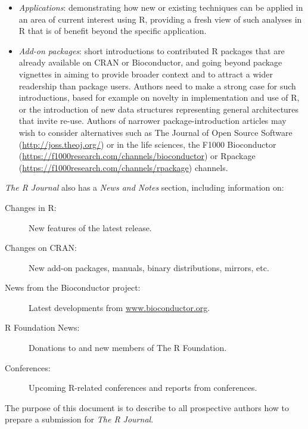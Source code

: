 \documentclass[a4paper]{report}
\begin{document}
\begin{article}
\begin{itemize}
\item \emph{Applications}: demonstrating how new or existing techniques can be applied in an area of current interest using R, providing a fresh view of such analyses in R that is of benefit beyond the specific application.

\item \emph{Add-on packages}: short introductions to contributed R packages that are already available on CRAN or Bioconductor, and going beyond package vignettes in aiming to provide broader context and to attract a wider readership than package users. Authors need to make a strong case for such introductions, based for example on novelty in implementation and use of R, or the introduction of new data structures representing general architectures that invite re-use. Authors of narrower package-introduction articles may wish to consider alternatives such as The Journal of Open Source Software (\url{http://joss.theoj.org/}) or in the life sciences, the F1000 Bioconductor (\url{https://f1000research.com/channels/bioconductor}) or Rpackage (\url{https://f1000research.com/channels/rpackage}) channels.

\end{itemize}

\noindent
\emph{The R Journal} also has a \emph{News and Notes} section,
including information on:

\begin{description}

\item[Changes in R:] New features of the latest release.

\item[Changes on CRAN:] New add-on packages, manuals, binary distributions,
mirrors, etc.

\item[News from the Bioconductor project:] Latest developments from 
\url{www.bioconductor.org}.

\item[R Foundation News:] Donations to and new members of The R Foundation.

\item[Conferences:] Upcoming R-related conferences and reports from
conferences.

\end{description}

The purpose of this document is to describe to all prospective authors how
to prepare a submission for \emph{The R Journal}.


\end{article}
\end{document}
